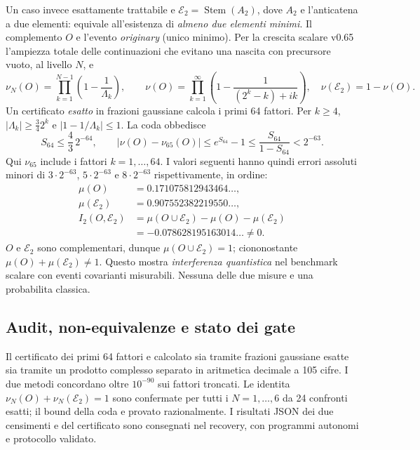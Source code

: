 \documentclass[11pt,a4paper]{article}
\begin{document}
Un caso invece esattamente trattabile e $\mathcal E_2=\operatorname{Stem}(A_2)$, dove $A_2$ e l'anticatena a due elementi: equivale all'esistenza di \emph{almeno due elementi minimi}. Il complemento $O$ e l'evento \emph{originary} (unico minimo). Per la crescita scalare v0.65 l'ampiezza totale delle continuazioni che evitano una nascita con precursore vuoto, al livello $N$, e
\begin{equation}
 \nu_N(O)=\prod_{k=1}^{N-1}\left(1-\frac1{\Lambda_k}\right),\qquad
 \nu(O)=\prod_{k=1}^{\infty}\left(1-\frac1{(2^k-k)+ik}\right),\quad
 \nu(\mathcal E_2)=1-\nu(O).
 \tag{CV.6}
\end{equation}
Un certificato \emph{esatto} in frazioni gaussiane calcola i primi 64 fattori. Per $k\ge4$, $|\Lambda_k|\ge\tfrac34 2^k$ e $|1-1/\Lambda_k|\le1$. La coda obbedisce
\begin{equation}
 S_{64}\le\frac43\,2^{-64},\qquad
 \left|\nu(O)-\nu_{65}(O)\right|\le e^{S_{64}}-1\le\frac{S_{64}}{1-S_{64}}<2^{-63}.
 \tag{CV.7}
\end{equation}
Qui $\nu_{65}$ include i fattori $k=1,\ldots,64$. I valori seguenti hanno quindi errori assoluti minori di $3\cdot2^{-63}$, $5\cdot2^{-63}$ e $8\cdot2^{-63}$ rispettivamente, in ordine:
\begin{equation}
 \begin{aligned}
 \mu(O)&=0.171075812943464\ldots,\\
 \mu(\mathcal E_2)&=0.907552382219550\ldots,\\
 I_2(O,\mathcal E_2)&=\mu(O\cup\mathcal E_2)-\mu(O)-\mu(\mathcal E_2)\\
  &=-0.078628195163014\ldots\ne0.
 \end{aligned}\tag{CV.8}
\end{equation}
$O$ e $\mathcal E_2$ sono complementari, dunque $\mu(O\cup\mathcal E_2)=1$; ciononostante $\mu(O)+\mu(\mathcal E_2)\ne1$. Questo mostra \emph{interferenza quantistica} nel benchmark scalare con eventi covarianti misurabili. Nessuna delle due misure e una probabilita classica.

\clearpage
\subsection*{Audit, non-equivalenze e stato dei gate}
Il certificato dei primi 64 fattori e calcolato sia tramite frazioni gaussiane esatte sia tramite un prodotto complesso separato in aritmetica decimale a 105 cifre. I due metodi concordano oltre $10^{-90}$ sui fattori troncati. Le identita $\nu_N(O)+\nu_N(\mathcal E_2)=1$ sono confermate per tutti i $N=1,\ldots,6$ da 24 confronti esatti; il bound della coda e provato razionalmente. I risultati JSON dei due censimenti e del certificato sono consegnati nel recovery, con programmi autonomi e protocollo validato.
\end{document}
